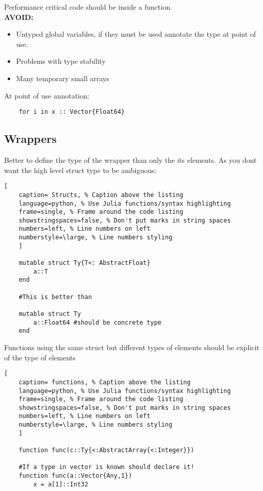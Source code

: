 \documentclass[11pt]{scrartcl} %
\begin{document}
Performance critical code should be inside a function.\\

\textbf{AVOID:}
\begin{itemize}
	\item Untyped global variables, if they must be used annotate the type at point of use.
	\item Problems with type stability
	\item Many temporary small arrays
\end{itemize}

At point of use annotation:
\begin{verbatim}
	for i in x :: Vector{Float64}
\end{verbatim}		

\subsection{Wrappers}

Better to define the type of the wrapper than only the its elements. As you dont want the high
level struct type to be ambiguous:

\begin{lstlisting}[
	caption= Structs, % Caption above the listing
	language=python, % Use Julia functions/syntax highlighting
	frame=single, % Frame around the code listing
	showstringspaces=false, % Don't put marks in string spaces
	numbers=left, % Line numbers on left
	numberstyle=\large, % Line numbers styling
	]

	mutable struct Ty{T<: AbstractFloat}
		a::T
	end

	#This is better than

	mutable struct Ty
		a::Float64 #should be concrete type
	end

\end{lstlisting}

Functions using the same struct but different types of elements should be explicit of the
type of elements

\begin{lstlisting}[
	caption= functions, % Caption above the listing
	language=python, % Use Julia functions/syntax highlighting
	frame=single, % Frame around the code listing
	showstringspaces=false, % Don't put marks in string spaces
	numbers=left, % Line numbers on left
	numberstyle=\large, % Line numbers styling
	]

	function func(c::Ty{<:AbstractArray{<:Integer}})

	#If a type in vector is known should declare it!
	function func(a::Vector{Any,1})
		x = a[1]::Int32


\end{lstlisting}
\end{document}
